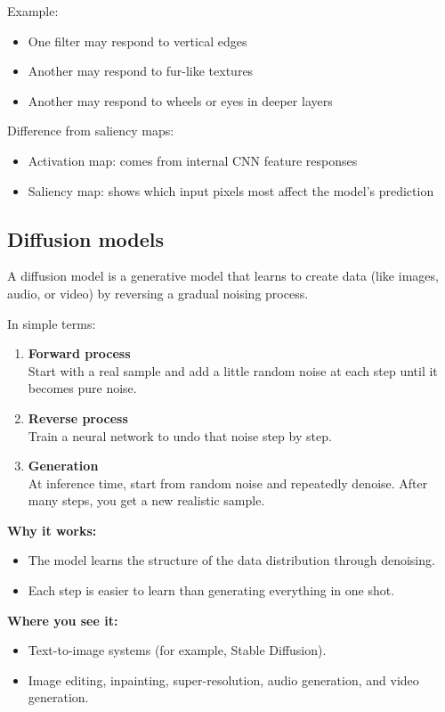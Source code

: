 \documentclass[12pt]{report}
\begin{document}
Example:
\begin{itemize}
	\item One filter may respond to vertical edges
	\item Another may respond to fur-like textures
	\item Another may respond to wheels or eyes in deeper layers
\end{itemize}

Difference from saliency maps:
\begin{itemize}
	\item Activation map: comes from internal CNN feature responses
	\item Saliency map: shows which input pixels most affect the model’s prediction
\end{itemize}


\subsection{Diffusion models}
A diffusion model is a generative model that learns to create data (like images, audio, or video) by reversing a gradual noising process.

In simple terms:

\begin{enumerate}
	\item \textbf{Forward process} \\
	Start with a real sample and add a little random noise at each step until it becomes pure noise.
	
	\item \textbf{Reverse process} \\
	Train a neural network to undo that noise step by step.
	
	\item \textbf{Generation} \\
	At inference time, start from random noise and repeatedly denoise. After many steps, you get a new realistic sample.
\end{enumerate}

\textbf{Why it works:}
\begin{itemize}
	\item The model learns the structure of the data distribution through denoising.
	\item Each step is easier to learn than generating everything in one shot.
\end{itemize}

\textbf{Where you see it:}
\begin{itemize}
	\item Text-to-image systems (for example, Stable Diffusion).
	\item Image editing, inpainting, super-resolution, audio generation, and video generation.
\end{itemize}
\end{document}

